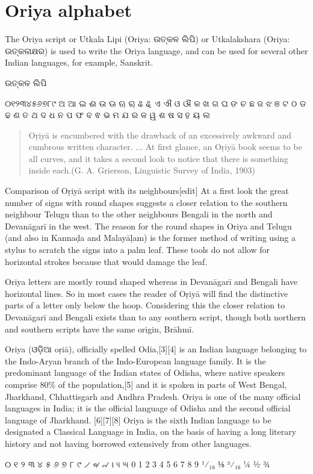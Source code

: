 \section{Oriya alphabet}
\newfontfamily{}

\def\oriyatext#1{{\oriya#1}}
The Oriya script or Utkala Lipi (Oriya: \oriyatext{ଉତ୍କଳ ଲିପି}) or Utkalakshara (Oriya: \oriyatext{ଉତ୍କଳାକ୍ଷର}) is used to write the Oriya language, and can be used for several other Indian languages, for example, Sanskrit.

\centerline{\Huge\oriyatext{ଉତ୍କଳ ଲିପି}}

\bgroup
\oriya
୦୧୨୩୪୫୬୭୮୯
ଅ ଆ ଇ ଈ ଉ ଊ ଋ ୠ ଌ ୡ ଏ ଐ ଓ ଔ କ ଖ ଗ ଘ ଙ ଚ ଛ ଜ ଝ ଞ ଟ ଠ ଡ ଢ ଣ ତ ଥ ଦ ଧ ନ ପ ଫ ବ ଵ ଭ ମ ଯ ର ଳ ୱ ଶ ଷ ସ ହ ୟ ଲ
\egroup

\begin{quotation}
Oṛiyā is encumbered with the drawback of an excessively awkward and cumbrous written character. ... At first glance, an Oṛiyā book seems to be all curves, and it takes a second look to notice that there is something inside each.(G. A. Grierson, Linguistic Survey of India, 1903)
\end{quotation}

Comparison of Oṛiyā script with its neighbours[edit]
At a first look the great number of signs with round shapes suggests a closer relation to the southern neighbour Telugu than to the other neighbours Bengali in the north and Devanāgarī in the west. The reason for the round shapes in Oriya and Telugu (and also in Kannaḍa and Malayāḷam) is the former method of writing using a stylus to scratch the signs into a palm leaf. These tools do not allow for horizontal strokes because that would damage the leaf.

Oriya letters are mostly round shaped whereas in Devanāgarī and Bengali have horizontal lines. So in most cases the reader of Oṛiyā will find the distinctive parts of a letter only below the hoop. Considering this the  closer relation to Devanāgarī and Bengali exists than to any southern script, though both northern and southern scripts have the same origin, Brāhmī.

Oriya (\oriyatext{ଓଡ଼ିଆ} oṛiā), officially spelled Odia,[3][4] is an Indian language belonging to the Indo-Aryan branch of the Indo-European language family. It is the predominant language of the Indian states of Odisha, where native speakers comprise 80\% of the population,[5] and it is spoken in parts of West Bengal, Jharkhand, Chhattisgarh and Andhra Pradesh. Oriya is one of the many official languages in India; it is the official language of Odisha and the second official language of Jharkhand. [6][7][8] Oriya is the sixth Indian language to be designated a Classical Language in India, on the basis of having a long literary history and not having borrowed extensively from other languages.





{\oriya
\obeylines
୦	୧	୨	୩	୪	୫	୬	୭	୮	୯	୵	୶	୷	୲	୳	୴
0	1	2	3	4	5	6	7	8	9	¹⁄₁₆	⅛	³⁄₁₆	¼	½	¾
}




